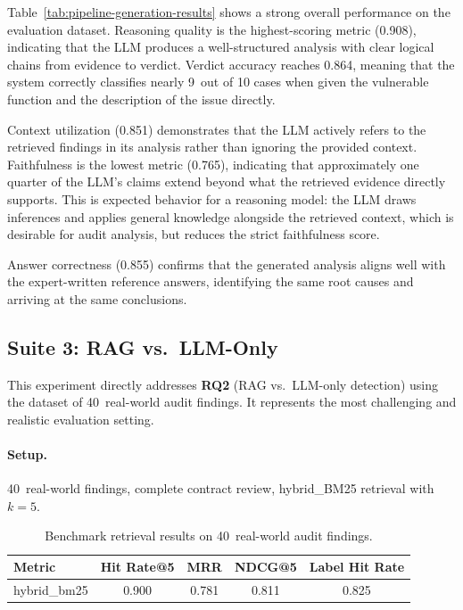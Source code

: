 Table~\ref{tab:pipeline-generation-results} shows a strong overall performance on the evaluation dataset. Reasoning quality is the highest-scoring metric (0.908), indicating that the LLM produces a well-structured analysis with clear logical chains from evidence to verdict. Verdict accuracy reaches 0.864, meaning that the system correctly classifies nearly 9~out of 10 cases when given the vulnerable function and the description of the issue directly.

Context utilization (0.851) demonstrates that the LLM actively refers to the retrieved findings in its analysis rather than ignoring the provided context. Faithfulness is the lowest metric (0.765), indicating that approximately one quarter of the LLM's claims extend beyond what the retrieved evidence directly supports. This is expected behavior for a reasoning model: the LLM draws inferences and applies general knowledge alongside the retrieved context, which is desirable for audit analysis, but reduces the strict faithfulness score.

Answer correctness (0.855) confirms that the generated analysis aligns well with the expert-written reference answers, identifying the same root causes and arriving at the same conclusions.

\subsection{Suite 3: RAG vs.\ LLM-Only}
\label{subsec:suite3}

This experiment directly addresses \textbf{RQ2} (RAG vs.\ LLM-only detection) using the dataset of 40~real-world audit findings. It represents the most challenging and realistic evaluation setting.

\paragraph{Setup.} 40~real-world findings, complete contract review, hybrid\_BM25 retrieval with $k{=}5$.

\begin{table}[!ht]
\centering
\small
\begin{tabular*}{\textwidth}{@{\extracolsep{\fill}} lcccc}
\toprule
\textbf{Metric} & \textbf{Hit Rate@5} & \textbf{MRR} & \textbf{NDCG@5} & \textbf{Label Hit Rate} \\
\midrule
hybrid\_bm25 & 0.900 & 0.781 & 0.811 & 0.825 \\
\bottomrule
\end{tabular*}
\caption[Benchmark retrieval results.]{Benchmark retrieval results on 40~real-world audit findings.}
\label{tab:golden-retrieval-results}
\end{table}

